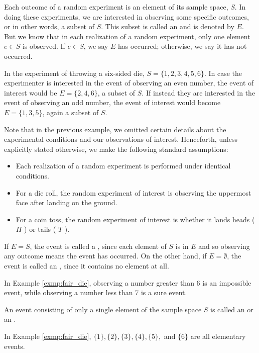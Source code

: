 Each outcome of a random experiment is an element of its sample space, \( S \).
In doing these experiments, we are interested in observing some specific outcomes, or in other words, a subset of \( S \).
This subset is called an  and is denoted by \( E \).
But we know that in each realization of a random experiment, only one element \( e \in S \) is observed.
If \( e \in S \), we say \( E \) has occurred; otherwise, we say it has not occurred.
\begin{exmp}\label{exmp:fair_die}
	In the experiment of throwing a six-sided die, \( S = \{ 1, 2, 3, 4, 5, 6 \} \).
	In case the experimenter is interested in the event of observing an even number, the event of interest would be \( E = \{ 2, 4, 6 \} \), a subset of \( S \).
	If instead they are interested in the event of observing an odd number, the event of interest would become \( E = \{ 1, 3, 5 \} \), again a subset of \( S \).
\end{exmp}
Note that in the previous example, we omitted certain details about the experimental conditions and our observations of interest.
Henceforth, unless explicitly stated otherwise, we make the following standard assumptions:
\begin{itemize}
	\item Each realization of a random experiment is performed under identical conditions.
	\item For a die roll, the random experiment of interest is observing the uppermost face after landing on the ground.
	\item For a coin toss, the random experiment of interest is whether it lands heads ( \( H \) ) or tails ( \( T \) ).
\end{itemize}
If \( E = S \), the event is called a , since each element of \( S \) is in \( E \) and so observing any outcome means the event has occurred.
On the other hand, if \( E = \emptyset \), the event is called an , since it contains no element at all.
\begin{exmp}
	In Example \autoref{exmp:fair_die}, observing a number greater than 6 is an impossible event, while observing a number less than 7 is a sure event.
\end{exmp}
An event consisting of only a single element of the sample space \( S \) is called an  or an .
\begin{exmp}
	In Example \autoref{exmp:fair_die}, \( \{ 1 \}, \{ 2 \}, \{ 3 \}, \{ 4 \}, \{ 5 \}, \) and \( \{ 6 \} \) are all elementary events.
\end{exmp}
